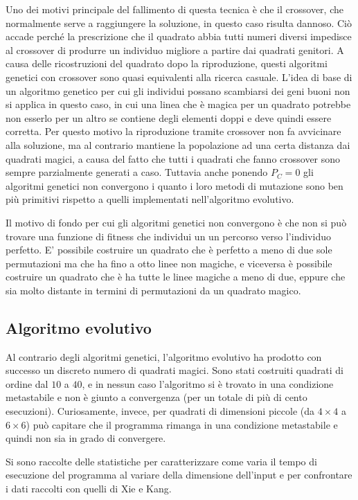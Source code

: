 \documentclass[italian,twoside,twocolumn]{article}
\begin{document}
Uno dei motivi principale del fallimento di questa tecnica è che il crossover, che normalmente serve a raggiungere la soluzione, in questo caso risulta dannoso. Ciò accade perché la prescrizione che il quadrato abbia tutti numeri diversi impedisce al crossover di produrre un individuo migliore a partire dai quadrati genitori. A causa delle ricostruzioni del quadrato dopo la riproduzione, questi algoritmi genetici con crossover sono quasi equivalenti alla ricerca casuale. L'idea di base di un algoritmo genetico per cui gli individui possano scambiarsi dei geni buoni non si applica in questo caso, in cui una linea che è magica per un quadrato potrebbe non esserlo per un altro se contiene degli elementi doppi e deve quindi essere corretta. Per questo motivo la riproduzione tramite crossover non fa avvicinare alla soluzione, ma al contrario mantiene la popolazione ad una certa distanza dai quadrati magici, a causa del fatto che tutti i quadrati che fanno crossover sono sempre 	parzialmente generati a caso. Tuttavia anche ponendo $ P_C = 0 $ gli algoritmi genetici non convergono i quanto i loro metodi di mutazione sono ben più primitivi rispetto a quelli implementati nell'algoritmo evolutivo. 

Il motivo di fondo per cui gli algoritmi genetici non convergono è che non si può trovare una funzione di fitness che individui un un percorso verso l'individuo perfetto. E' possibile costruire un quadrato che è perfetto a meno di due sole permutazioni ma che ha fino a otto linee non magiche, e viceversa è possibile costruire un quadrato che è ha tutte le linee magiche a meno di due, eppure che sia molto distante in termini di permutazioni da un quadrato magico.

\subsection{Algoritmo evolutivo}
Al contrario degli algoritmi genetici, l'algoritmo evolutivo ha prodotto con successo un discreto numero di quadrati magici. Sono stati costruiti quadrati di ordine dal $ 10 $ a $ 40 $, e in nessun caso l'algoritmo si è trovato in una condizione metastabile e non è giunto a convergenza (per un totale di più di cento esecuzioni). Curiosamente, invece, per quadrati di dimensioni piccole (da $ 4\times 4 $ a $ 6\times6 $) può capitare che il programma rimanga in una condizione metastabile e quindi non sia in grado di convergere. 

Si sono raccolte delle statistiche per caratterizzare come varia il tempo di esecuzione del programma al variare della dimensione dell'input e per confrontare i dati raccolti con quelli di Xie e Kang. 
\end{document}
